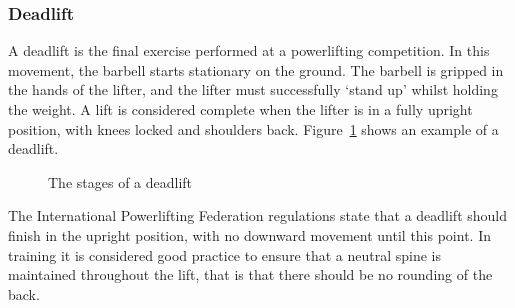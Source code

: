 \subsubsection{Deadlift}

A deadlift is the final exercise performed at a powerlifting competition. In this movement, the barbell starts stationary on the ground. The barbell is gripped in the hands of the lifter, and the lifter must successfully ‘stand up’ whilst holding the weight. A lift is considered complete when the lifter is in a fully upright position, with knees locked and shoulders back. Figure~\ref{fig:dead_stages} shows an example of a deadlift.

\begin{figure}[H]
    \centering
\caption{The stages of a deadlift}
\label{fig:dead_stages}
\end{figure}

The International Powerlifting Federation regulations\cite{ipf} state that a deadlift should finish in the upright position, with no downward movement until this point. In training it is considered good practice to ensure that a neutral spine is maintained throughout the lift, that is that there should be no rounding of the back.
